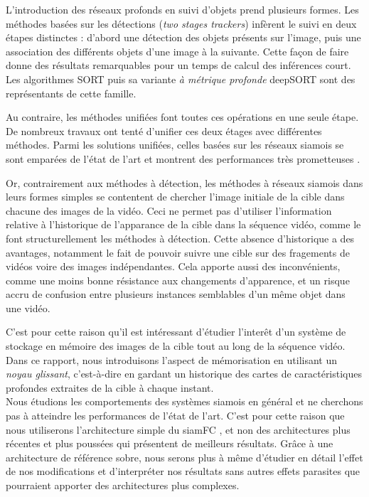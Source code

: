 \documentclass[10pt,twocolumn,letterpaper,french]{article}
\begin{document}
   L'introduction des réseaux profonds en suivi d'objets prend plusieurs formes. Les méthodes basées sur les détections (\textit{two stages trackers}) infèrent le suivi en deux étapes distinctes : d'abord une détection des objets présents sur l'image, puis une association des différents objets d'une image à la suivante. Cette façon de faire donne des résultats remarquables pour un temps de calcul des inférences court. Les algorithmes SORT \cite{SORT} puis sa variante \textit{à métrique profonde} deepSORT \cite{deepSORT} sont des représentants de cette famille.
   
   Au contraire, les méthodes unifiées font toutes ces opérations en une seule étape. De nombreux travaux ont tenté d'unifier ces deux étages avec différentes méthodes. Parmi les solutions unifiées, celles basées sur les réseaux siamois se sont emparées de l'état de l'art et montrent des performances très prometteuses \cite{siamfc, siamfcplusplus, siamMask}. 
   
   Or, contrairement aux méthodes à détection, les méthodes à réseaux siamois dans leurs formes simples se contentent de chercher l'image initiale de la cible dans chacune des images de la vidéo. Ceci ne permet pas d'utiliser l'information relative à l'historique de l'apparance de la cible dans la séquence vidéo, comme le font structurellement les méthodes à détection. Cette absence d'historique a des avantages, notamment le fait de pouvoir suivre une cible sur des fragements de vidéos voire des images indépendantes. Cela apporte aussi des inconvénients, comme une moins bonne résistance aux changements d'apparence, et un risque accru de confusion entre plusieurs instances semblables d'un même objet dans une vidéo.
   
   C'est pour cette raison qu'il est intéressant d'étudier l'interêt d'un système de stockage en mémoire des images de la cible tout au long de la séquence vidéo. Dans ce rapport, nous introduisons l'aspect de mémorisation en utilisant un \textit{noyau glissant}, c'est-à-dire en gardant un historique des cartes de caractéristiques profondes extraites de la cible à chaque instant.\\
  
  Nous étudions les comportements des systèmes siamois en général et ne cherchons pas à atteindre les performances de l'état de l'art. C'est pour cette raison que nous utiliserons l'architecture simple du siamFC \cite{siamfc}, et non des architectures plus récentes et plus poussées qui présentent de meilleurs résultats. Grâce à une architecture de référence sobre, nous serons plus à même d'étudier en détail l'effet de nos modifications et d'interpréter nos résultats sans autres effets parasites que pourraient apporter des architectures plus complexes.
\end{document}
